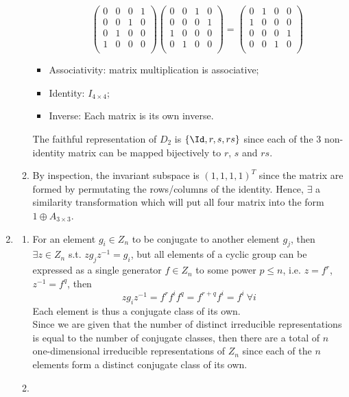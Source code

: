 \documentclass[a4paper]{article}
\begin{document}
\begin{ans}
\begin{enumerate}[label=(\roman*)]
\begin{enumerate}[label=(\alph*)]
\begin{itemize}
    $$\begin{pmatrix}0&0&0&1\\0&0&1&0\\0&1&0&0\\1&0&0&0\\\end{pmatrix}\begin{pmatrix}0&0&1&0\\0&0&0&1\\1&0&0&0\\0&1&0&0\\\end{pmatrix}=\begin{pmatrix}0&1&0&0\\1&0&0&0\\0&0&0&1\\0&0&1&0\\\end{pmatrix}$$
    \item Associativity: matrix multiplication is associative;
    \item Identity: $I_{4\times 4}$;
    \item Inverse: Each matrix is its own inverse.
\end{itemize}
The faithful representation of $D_2$ is $\{\Id,r,s,rs\}$ since each of the 3 non-identity matrix can be mapped bijectively to $r$, $s$ and $rs$.
\item By inspection, the invariant subspace is $(1,1,1,1)^T$ since the matrix are formed by permutating the rows/columns of the identity. Hence, $\exists$ a similarity transformation which will put all four matrix into the form $1\oplus A_{3\times 3}$.
\end{enumerate}
\item 
\begin{enumerate}[label=(\alph*)]
\item 
For an element $g_i\in Z_n$ to be conjugate to another element $g_j$, then $\exists z\in Z_n$ s.t. $zg_jz^{-1}=g_i$, but all elements of a cyclic group can be expressed as a single generator $f\in Z_n$ to some power $p\leq n$, i.e. $z=f^r$, $z^{-1}=f^q$, then
$$zg_iz^{-1}=f^rf^if^q=f^{r+q}f^i=f^i~\forall i$$
Each element is thus a conjugate class of its own.\\[5pt]
Since we are given that the number of distinct irreducible representations is equal to the number of conjugate classes, then there are a total of $n$ one-dimensional irreducible representations of $Z_n$ since each of the $n$ elements form a distinct conjugate class of its own.
\item 

\end{enumerate}
\end{enumerate}
\end{ans}
\end{document}
